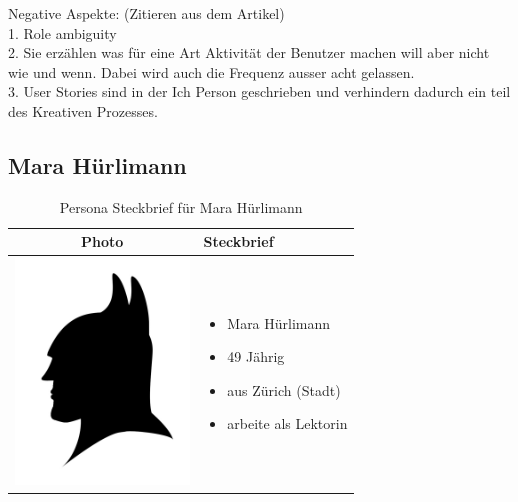 \begin{description}
{  Negative Aspekte: (Zitieren aus dem Artikel) \\
  1. Role ambiguity \\
  2. Sie erzählen was für eine Art Aktivität der Benutzer machen will aber nicht wie und wenn. Dabei wird auch die Frequenz ausser acht gelassen. \\
  3. User Stories sind in der Ich Person geschrieben und verhindern dadurch ein teil des Kreativen Prozesses. \\
}


\subsection{Mara Hürlimann}

\begin{table}[h!]
  \centering
  \begin{tabular}{ | c | m{5cm} | }
    \hline
    Photo & Steckbrief \\ \hline
    \begin{minipage}{.3\textwidth}
      \includegraphics[width=\linewidth, height=60mm]{images/batman.jpg}
    \end{minipage}
    &
      \begin{itemize}
        \item Mara Hürlimann
        \item 49 Jährig
        \item aus Zürich (Stadt)
        \item arbeite als Lektorin
      \end{itemize}
    \\ \hline
  \end{tabular}
  \caption{Persona Steckbrief für Mara Hürlimann}\label{tbl:steckbriefmara}
\end{table}


\end{description}
